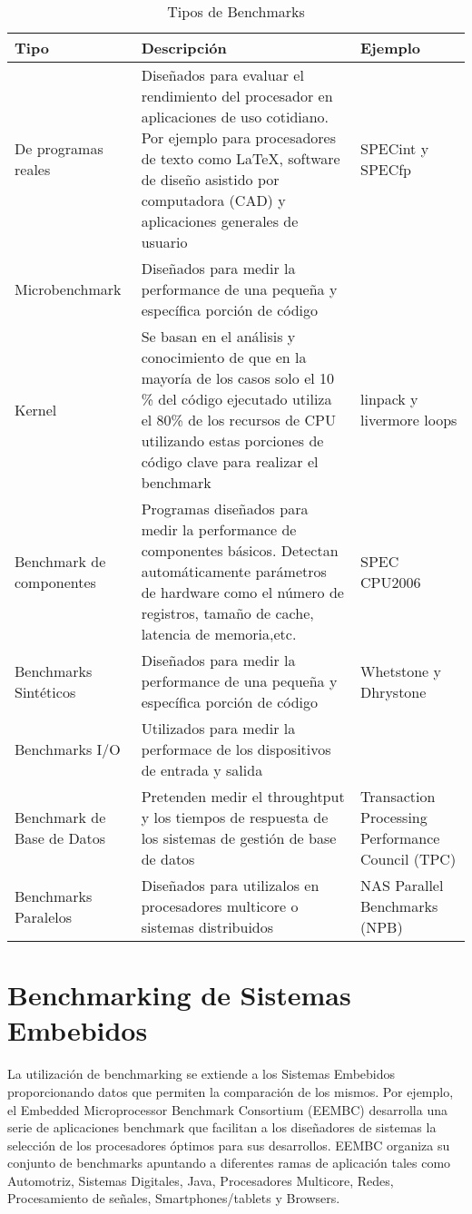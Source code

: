 \begin {table}[!h]
\begin{tabular}{ p{2.5cm} p{8cm} p{3cm} }
\hline 
\rowcolor[gray]{0.8} Tipo & Descripción & Ejemplo \\
\hline
De programas reales & Diseñados para evaluar el
rendimiento del procesador en aplicaciones de uso
cotidiano. Por ejemplo para procesadores de texto como \LaTeX, software
de diseño asistido por computadora (CAD) y
aplicaciones generales de usuario & SPECint y SPECfp\\
\hline
Microbenchmark & Diseñados para medir la performance
de una pequeña y específica porción de código \\
\hline
Kernel & Se basan en el análisis y conocimiento de
que en la mayoría de los casos solo el 10 \% del
código ejecutado utiliza el 80\% de los recursos de
CPU utilizando estas porciones de código clave para
realizar el benchmark & linpack y
livermore loops\\
\hline
Benchmark de componentes & Programas diseñados para
medir la performance de componentes básicos. Detectan
automáticamente parámetros de hardware como el número
de registros, tamaño de cache, latencia de
memoria,etc. & SPEC CPU2006\\
\hline
Benchmarks Sintéticos & Diseñados para medir la
performance de una pequeña y específica porción de
código & Whetstone y Dhrystone\\
\hline
Benchmarks I/O & Utilizados para medir la performace
de los dispositivos de entrada y salida & \\
\hline
Benchmark de Base de Datos & Pretenden medir el
throughtput y los tiempos de respuesta de los sistemas
de gestión de base de datos & Transaction Processing
Performance Council (TPC)\\
\hline
Benchmarks Paralelos & Diseñados para utilizalos
en procesadores multicore o sistemas distribuidos &
NAS Parallel Benchmarks (NPB)\\
\hline
\end{tabular}
\caption {Tipos de Benchmarks}
\label{tab:bench}
\end{table}

\newpage	
\section{Benchmarking de Sistemas Embebidos}

La utilización de benchmarking se extiende a los Sistemas Embebidos
proporcionando datos que permiten la comparación de los mismos. Por
ejemplo, el Embedded Microprocessor Benchmark Consortium (EEMBC)
desarrolla una serie de aplicaciones benchmark que facilitan a los
diseñadores de sistemas la selección de los procesadores óptimos para
sus desarrollos. EEMBC organiza su conjunto de benchmarks apuntando a
diferentes ramas de aplicación tales como Automotriz, Sistemas
Digitales, Java, Procesadores Multicore, Redes, Procesamiento de
señales, Smartphones/tablets y Browsers.
	
